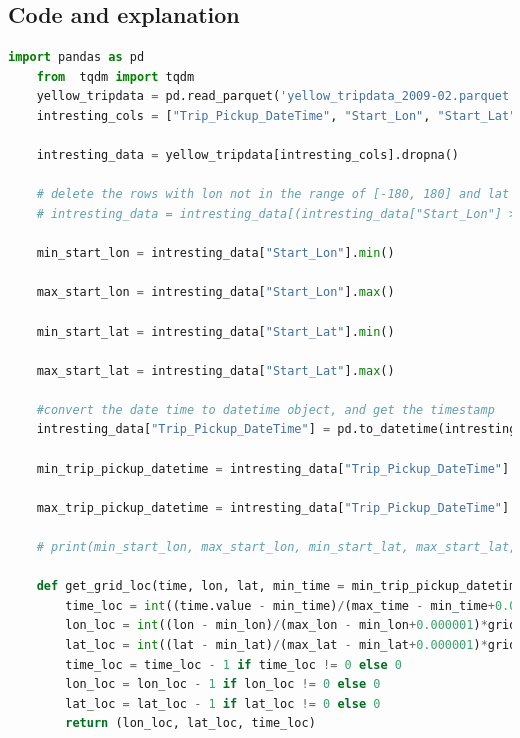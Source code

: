 \documentclass{article}
\begin{document}
\subsection{Code and explanation}
\begin{lstlisting}[language=Python, caption=Task 1, label=task1, breaklines=true]
    import pandas as pd
    from  tqdm import tqdm
    yellow_tripdata = pd.read_parquet('yellow_tripdata_2009-02.parquet')
    intresting_cols = ["Trip_Pickup_DateTime", "Start_Lon", "Start_Lat","Total_Amt"]
    
    intresting_data = yellow_tripdata[intresting_cols].dropna()
    
    # delete the rows with lon not in the range of [-180, 180] and lat not in the range of [-90, 90]
    # intresting_data = intresting_data[(intresting_data["Start_Lon"] >= -180) & (intresting_data["Start_Lon"] <= 180) & (intresting_data["Start_Lat"] >= -90) & (intresting_data["Start_Lat"] <= 90)]
    
    min_start_lon = intresting_data["Start_Lon"].min()
    
    max_start_lon = intresting_data["Start_Lon"].max()
    
    min_start_lat = intresting_data["Start_Lat"].min()
    
    max_start_lat = intresting_data["Start_Lat"].max()
    
    #convert the date time to datetime object, and get the timestamp
    intresting_data["Trip_Pickup_DateTime"] = pd.to_datetime(intresting_data["Trip_Pickup_DateTime"])
    
    min_trip_pickup_datetime = intresting_data["Trip_Pickup_DateTime"].min().value
    
    max_trip_pickup_datetime = intresting_data["Trip_Pickup_DateTime"].max().value
    
    # print(min_start_lon, max_start_lon, min_start_lat, max_start_lat, min_trip_pickup_datetime, max_trip_pickup_datetime)
    
    def get_grid_loc(time, lon, lat, min_time = min_trip_pickup_datetime, max_time = max_trip_pickup_datetime, min_lon = min_start_lon, max_lon = max_start_lon, min_lat = min_start_lat, max_lat = max_start_lat, grid_size = 100):
        time_loc = int((time.value - min_time)/(max_time - min_time+0.000001)*grid_size)
        lon_loc = int((lon - min_lon)/(max_lon - min_lon+0.000001)*grid_size)
        lat_loc = int((lat - min_lat)/(max_lat - min_lat+0.000001)*grid_size)
        time_loc = time_loc - 1 if time_loc != 0 else 0
        lon_loc = lon_loc - 1 if lon_loc != 0 else 0
        lat_loc = lat_loc - 1 if lat_loc != 0 else 0
        return (lon_loc, lat_loc, time_loc)
        

\end{lstlisting}
\end{document}
